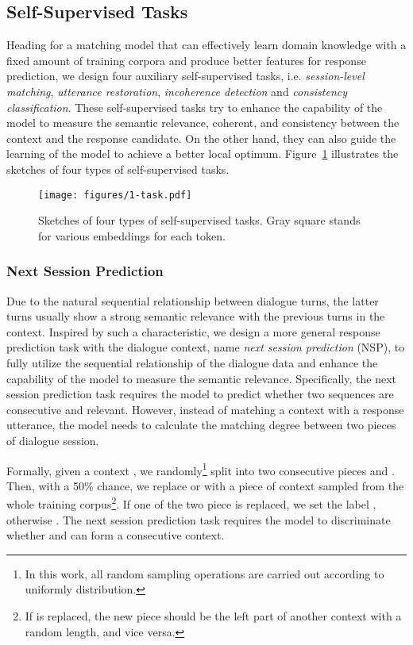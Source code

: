 \documentclass{article}
\begin{document}
\subsection{Self-Supervised Tasks}

Heading for a matching model that can effectively learn domain knowledge with a fixed amount of training corpora and produce better features for response prediction,
we design four auxiliary self-supervised tasks,
i.e. \emph{session-level matching}, \emph{utterance restoration}, \emph{incoherence detection} and \emph{ consistency classification}. These self-supervised tasks try to enhance the capability of the model to measure the semantic relevance, coherent, and  consistency between the context and the response candidate.
On the other hand, they can also  guide the learning of the model to achieve a better local optimum. Figure~\ref{fig:tasks} illustrates the sketches of four types of self-supervised tasks.

\begin{figure}[t!]
  \centering
   \texttt{[image: figures/1-task.pdf]}
  \caption{Sketches of four types of self-supervised tasks. Gray square stands for various embeddings for each token.}
  \label{fig:tasks}
\end{figure}

\subsubsection{Next Session Prediction}
Due to the natural sequential relationship between dialogue turns, the latter turns usually show a strong semantic relevance with the previous turns in the context. Inspired by such a characteristic, we design a more general response prediction task with the dialogue context, name \emph{next session prediction} (NSP), to fully utilize the sequential relationship of the dialogue data and enhance the capability of the model to measure the semantic relevance.
Specifically, the next session prediction task requires the model to predict whether two sequences are consecutive and relevant.
However, instead of matching a context with a response utterance, the model needs to calculate the matching degree between two pieces of dialogue session.


Formally, given a context , we randomly\footnote{In this work, all random sampling operations are carried out according to uniformly distribution.} split  into two consecutive pieces  and .
Then, with a 50\% chance, we replace  or  with a piece of context
sampled from the whole training corpus\footnote{If  is replaced, the new piece should be the left part of another context with a random length, and vice versa.}.
If one of the two piece is replaced, we set the label , otherwise .
The next session prediction task requires the model to discriminate whether  and  can form a consecutive context.
\end{document}
